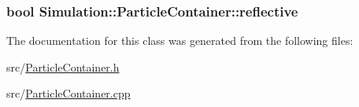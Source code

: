 \hypertarget{classSimulation_1_1ParticleContainer_a53f222132c6a1177d3a14939e865de35}{
\subsubsection[{reflective}]{\setlength{\rightskip}{0pt plus 5cm}bool Simulation\-::\-Particle\-Container\-::reflective\hspace{0.3cm}{\ttfamily [private]}}}\label{classSimulation_1_1ParticleContainer_a53f222132c6a1177d3a14939e865de35}


The documentation for this class was generated from the following files\-:\begin{DoxyCompactItemize}
\item 
src/\hyperlink{ParticleContainer_8h}{Particle\-Container.\-h}\item 
src/\hyperlink{ParticleContainer_8cpp}{Particle\-Container.\-cpp}\end{DoxyCompactItemize}
